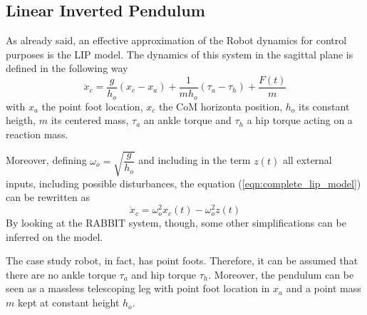 \documentclass[11pt]{article}
\begin{document}
\subsection{Linear Inverted Pendulum}

As already said, an effective approximation of the Robot dynamics for control purposes is the LIP model. The dynamics of this system in the sagittal plane is defined in the following way
\begin{equation}
\label{eqn:complete_lip_model}
\ddot{x}_c = \frac{g}{h_o}(x_c-x_a)+\frac{1}{mh_o}(\tau_a-\tau_h)+\frac{F(t)}{m}
\end{equation}
with $x_a$ the point foot location, $x_c$ the CoM horizonta position, $h_o$ its constant heigth, $m$ its centered mass, $\tau_a$ an ankle torque and $\tau_h$ a hip torque acting on a reaction mass.

Moreover, defining $\omega_o = \sqrt{\dfrac{g}{h_o}}$ and including in the term $z(t)$ all external inputs, including possible disturbances, the equation (\ref{eqn:complete_lip_model}) can be rewritten as
\begin{equation}
\label{eqn:general_lip_model}
\ddot{x}_c = \omega_o^2x_c(t) - \omega_o^2z(t)
\end{equation}
By looking at the RABBIT system, though, some other simplifications can be inferred on the model.

The case study robot, in fact, has point foots. Therefore, it can be assumed that there are no ankle torque $\tau_a$ and hip torque $\tau_h$. Moreover, the pendulum can be seen as a massless telescoping leg with point foot location in $x_a$ and a point mass $m$ kept at constant height $h_o$.
\end{document}

